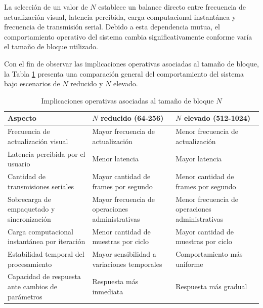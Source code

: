 La selección de un valor de $N$ establece un balance directo entre frecuencia de actualización visual, latencia percibida, carga computacional instantánea y frecuencia de transmisión serial. Debido a esta dependencia mutua, el comportamiento operativo del sistema cambia significativamente conforme varía el tamaño de bloque utilizado.

Con el fin de observar las implicaciones operativas asociadas al tamaño de bloque, la Tabla \ref{tab:comparacion_n} presenta una comparación general del comportamiento del sistema bajo escenarios de $N$ reducido y $N$ elevado.

\begin{table}[H]
\centering
\footnotesize
\caption{Implicaciones operativas asociadas al tamaño de bloque $N$}
\label{tab:comparacion_n}
\begin{tabular}{|p{4.9cm}|p{4.9cm}|p{4.9cm}|}
\hline
\textbf{Aspecto} & \textbf{$N$ reducido (64-256)} & \textbf{$N$ elevado (512-1024)} \\ \hline

Frecuencia de actualización visual &
Mayor frecuencia de actualización &
Menor frecuencia de actualización \\ \hline

Latencia percibida por el usuario &
Menor latencia &
Mayor latencia \\ \hline

Cantidad de transmisiones seriales &
Mayor cantidad de frames por segundo &
Menor cantidad de frames por segundo \\ \hline

Sobrecarga de empaquetado y sincronización &
Mayor frecuencia de operaciones administrativas &
Menor frecuencia de operaciones administrativas \\ \hline

Carga computacional instantánea por iteración &
Menor cantidad de muestras por ciclo &
Mayor cantidad de muestras por ciclo \\ \hline

Estabilidad temporal del procesamiento &
Mayor sensibilidad a variaciones temporales &
Comportamiento más uniforme \\ \hline

Capacidad de respuesta ante cambios de parámetros &
Respuesta más inmediata &
Respuesta más gradual \\ \hline

\end{tabular}
\end{table}

